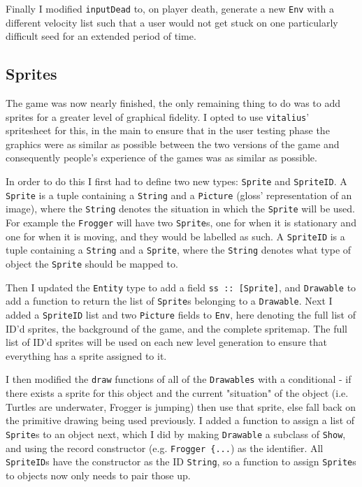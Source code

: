 \documentclass[12pt, a4paper]{report}
\begin{document}
\par

Finally I modified \verb|inputDead| to, on player death, generate a new \verb|Env| with a different velocity list such that a user would not get stuck on one particularly difficult seed for an extended period of time.

\subsection{Sprites}

The game was now nearly finished, the only remaining thing to do was to add sprites for a greater level of graphical fidelity.
I opted to use \verb|vitalius|' spritesheet for this, in the main to ensure that in the user testing phase the graphics were as similar as possible between the two versions of the game and consequently people's experience of the games was as similar as possible.

\par

In order to do this I first had to define two new types: \verb|Sprite| and \verb|SpriteID|.
A \verb|Sprite| is a tuple containing a \verb|String| and a \verb|Picture| (gloss' representation of an image), where the \verb|String| denotes the situation in which the \verb|Sprite| will be used.
For example the \verb|Frogger| will have two \verb|Sprite|s, one for when it is stationary and one for when it is moving, and they would be labelled as such.
A \verb|SpriteID| is a tuple containing a \verb|String| and a \verb|Sprite|, where the \verb|String| denotes what type of object the \verb|Sprite| should be mapped to.

\par

Then I updated the \verb|Entity| type to add a field \verb|ss :: [Sprite]|, and \verb|Drawable| to add a function to return the list of \verb|Sprite|s belonging to a \verb|Drawable|.
Next I added a \verb|SpriteID| list and two \verb|Picture| fields to \verb|Env|, here denoting the full list of ID'd sprites, the background of the game, and the complete spritemap.
The full list of ID'd sprites will be used on each new level generation to ensure that everything has a sprite assigned to it.

\par

I then modified the \verb|draw| functions of all of the \verb|Drawables| with a conditional - if there exists a sprite for this object and the current "situation" of the object (i.e. Turtles are underwater, Frogger is jumping) then use that sprite, else fall back on the primitive drawing being used previously.
I added a function to assign a list of \verb|Sprite|s to an object next, which I did by making \verb|Drawable| a subclass of \verb|Show|, and using the record constructor (e.g. \verb|Frogger {...|) as the identifier.
All \verb|SpriteID|s have the constructor as the ID \verb|String|, so a function to assign \verb|Sprite|s to objects now only needs to pair those up.
\end{document}
